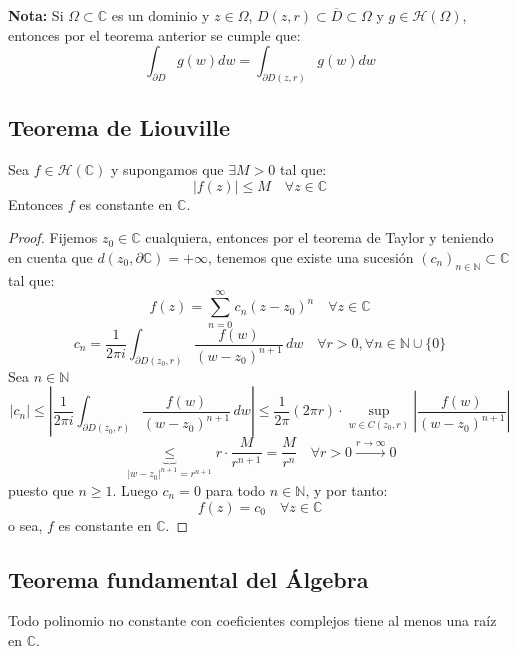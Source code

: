 \textbf{Nota: } Si $\Omega \subset \mathbb{C}$ es un dominio y $z \in \Omega$,  $D(z,r) \subset \overline{D} \subset \Omega$ y $g \in \mathcal{H}(\Omega)$, entonces por el teorema anterior se cumple que:
\[
\int_{\partial D} g(w) dw =
\int_{\partial D(z,r)} g(w) dw
\] 

\subsection{Teorema de Liouville}
\begin{teorema} 
    Sea $f \in \mathcal{H}(\mathbb{C})$ y supongamos que $\exists M > 0$ tal que:
    \[
        |f(z)| \leq M \quad \forall z \in \mathbb{C}
    \]
    Entonces $f$ es constante en $\mathbb{C}$.
\end{teorema}


\begin{proof}
    Fijemos $z_0 \in \mathbb{C}$ cualquiera, entonces por el teorema de Taylor y teniendo en cuenta que $d(z_0, \partial \mathbb{C}) = +\infty$, tenemos que existe una sucesión $(c_n)_{n \in \mathbb{N}} \subset \mathbb{C}$ tal que:
    \[
        f(z) =
        \sum_{n=0}^{\infty} c_n (z - z_0)^n \quad \forall z \in \mathbb{C}
    \]
    \[
        c_n = \frac{1}{2 \pi i} \int_{\partial D(z_0, r)} \frac{f(w)}{(w - z_0)^{n+1}} \, dw \quad \forall r > 0, \forall n \in \mathbb{N} \cup \{0\}
    \]
    Sea $n \in \mathbb{N}$
    \[
        |c_n| \leq \left| \frac{1}{2 \pi i} \int_{\partial D(z_0, r)} \frac{f(w)}{(w - z_0)^{n+1}} \, dw \right| \leq \frac{1}{2 \pi} (2 \pi r) \cdot \sup_{w \in C(z_0, r)} \left| \frac{f(w)}{(w - z_0)^{n+1}} \right| 
    \]    
    \[
    \underbrace{\leq}_{|w-z_0|^{n+1}=r^{n+1}} r \cdot \frac{M}{r^{n+1}} = \frac{M}{r^n} \quad \forall r > 0 \xrightarrow{r \to \infty} 0
    \]
    puesto que $n \geq 1$. Luego $c_n = 0$ para todo $n \in \mathbb{N}$, y por tanto:
    \[
        f(z) = c_0 \quad \forall z \in \mathbb{C}
    \]
    o sea, $f$ es constante en $\mathbb{C}$.
\end{proof}

\subsection{Teorema fundamental del Álgebra}
\begin{teorema} 
    Todo polinomio no constante con coeficientes complejos tiene al menos una raíz en $\mathbb{C}$.    
\end{teorema}

